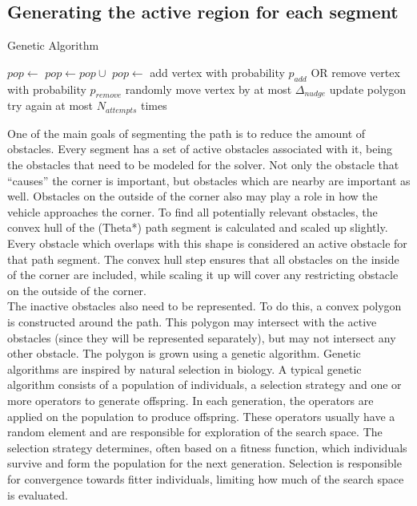\subsection{Generating the active region for each segment}
\begin{algorithm}
\caption{Genetic Algorithm}
\label{alg:ga}
\begin{algorithmic}[1]
\State $pop \leftarrow $ 
\State $pop \leftarrow pop \cup $ 
\State {}
\State $pop \leftarrow $ 
\EndFor
\Return {}
\EndFunction
{}
\State add vertex with probability $p_{add}$
\State OR remove vertex with probability $p_{remove}$
\State randomly move vertex by at most $\Delta_{nudge}$
\State update polygon
\Else
\State try again at most $N_{attempts}$ times
\EndIf
\EndFor
\EndFor
\Return {}
\EndFunction
\end{algorithmic}
\end{algorithm}
One of the main goals of segmenting the path is to reduce the amount of obstacles. Every segment has a set of active obstacles associated with it, being the obstacles that need to be modeled for the solver. Not only the obstacle that ``causes'' the corner is important, but obstacles which are nearby are important as well. Obstacles on the outside of the corner also may play a role in how the vehicle approaches the corner. To find all potentially relevant obstacles, the convex hull of the (Theta*) path segment is calculated and scaled up slightly. Every obstacle which overlaps with this shape is considered an active obstacle for that path segment. The convex hull step ensures that all obstacles on the inside of the corner are included, while scaling it up will cover any restricting obstacle on the outside of the corner.\\
The inactive obstacles also need to be represented. To do this, a convex polygon is constructed around the path. This polygon may intersect with the active obstacles (since they will be represented separately), but may not intersect any other obstacle. The polygon is grown using a genetic algorithm. Genetic algorithms are inspired by natural selection in biology. A typical genetic algorithm consists of a population of individuals, a selection strategy and one or more operators to generate offspring. In each generation, the operators are applied on the population to produce offspring. These operators usually have a random element and are responsible for exploration of the search space. The selection strategy determines, often based on a fitness function, which individuals survive and form the population for the next generation. Selection is responsible for convergence towards fitter individuals, limiting how much of the search space is evaluated. \\
